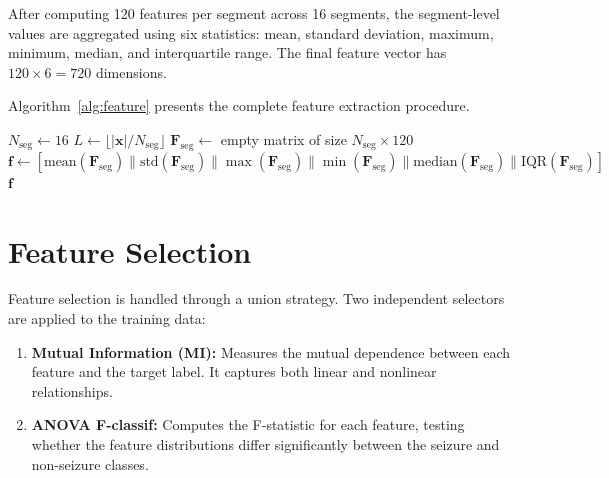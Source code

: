 After computing 120 features per segment across 16 segments, the segment-level values are aggregated using six statistics: mean, standard deviation, maximum, minimum, median, and interquartile range. The final feature vector has $120 \times 6 = 720$ dimensions.

Algorithm~\ref{alg:feature} presents the complete feature extraction procedure.

\begin{algorithm}[ht]
\caption{Multi-Domain Feature Extraction}
\label{alg:feature}
\SetAlgoLined
{}
\BlankLine
$N_{\text{seg}} \leftarrow 16$\;
$L \leftarrow \lfloor |\mathbf{x}| / N_{\text{seg}} \rfloor$\;
$\mathbf{F}_{\text{seg}} \leftarrow$ empty matrix of size $N_{\text{seg}} \times 120$\;
\BlankLine
{}
\BlankLine
{}
$\mathbf{f} \leftarrow [\text{mean}(\mathbf{F}_{\text{seg}}) \| \text{std}(\mathbf{F}_{\text{seg}}) \| \max(\mathbf{F}_{\text{seg}}) \| \min(\mathbf{F}_{\text{seg}}) \| \text{median}(\mathbf{F}_{\text{seg}}) \| \text{IQR}(\mathbf{F}_{\text{seg}})]$\;
\BlankLine
\Return $\mathbf{f}$\;
\end{algorithm}

\section{Feature Selection}

Feature selection is handled through a union strategy. Two independent selectors are applied to the training data:

\begin{enumerate}
    \item \textbf{Mutual Information (MI):} Measures the mutual dependence between each feature and the target label. It captures both linear and nonlinear relationships.
    
    \item \textbf{ANOVA F-classif:} Computes the F-statistic for each feature, testing whether the feature distributions differ significantly between the seizure and non-seizure classes.
\end{enumerate}

